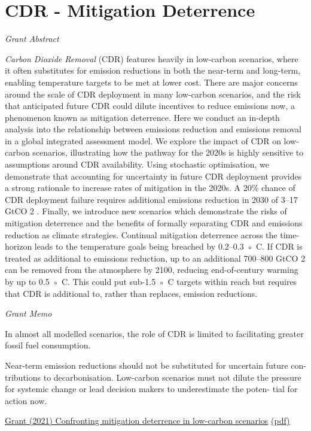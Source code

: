 \documentclass[
]{book}
\begin{document}
\hypertarget{cdr---mitigation-deterrence}{%
\section{CDR - Mitigation Deterrence}\label{cdr---mitigation-deterrence}}

\emph{Grant Abstract}

\emph{Carbon Dioxide Removal} (CDR) features heavily in low-carbon scenarios, where it often substitutes
for emission reductions in both the near-term and long-term, enabling temperature targets to be
met at lower cost. There are major concerns around the scale of CDR deployment in many
low-carbon scenarios, and the risk that anticipated future CDR could dilute incentives to reduce
emissions now, a phenomenon known as mitigation deterrence. Here we conduct an in-depth
analysis into the relationship between emissions reduction and emissions removal in a global
integrated assessment model. We explore the impact of CDR on low-carbon scenarios, illustrating
how the pathway for the 2020s is highly sensitive to assumptions around CDR availability. Using
stochastic optimisation, we demonstrate that accounting for uncertainty in future CDR
deployment provides a strong rationale to increase rates of mitigation in the 2020s. A 20\% chance
of CDR deployment failure requires additional emissions reduction in 2030 of 3--17 GtCO 2 .
Finally, we introduce new scenarios which demonstrate the risks of mitigation deterrence and the
benefits of formally separating CDR and emissions reduction as climate strategies. Continual
mitigation deterrence across the time-horizon leads to the temperature goals being breached by
0.2--0.3 ◦ C. If CDR is treated as additional to emissions reduction, up to an additional
700--800 GtCO 2 can be removed from the atmosphere by 2100, reducing end-of-century warming
by up to 0.5 ◦ C. This could put sub-1.5 ◦ C targets within reach but requires that CDR is additional
to, rather than replaces, emission reductions.

\emph{Grant Memo}

In almost all modelled scenarios, the role of CDR is
limited to facilitating greater fossil fuel consumption.

Near-term emission reductions
should not be substituted for uncertain future con-
tributions to decarbonisation. Low-carbon scenarios
must not dilute the pressure for systemic change or
lead decision makers to underestimate the poten-
tial for action now.

\href{https://iopscience.iop.org/article/10.1088/1748-9326/ac0749}{Grant (2021) Confronting mitigation deterrence in low-carbon scenarios}
\href{pdf/Grant_2021_Mitigation_Deterrence.pdf}{(pdf)}
\end{document}
